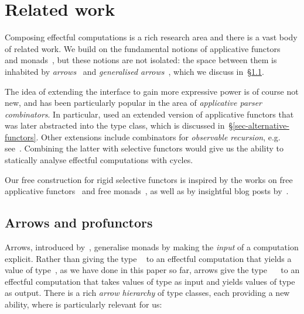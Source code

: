 \section{Related work}\label{sec-related}

Composing effectful computations is a rich research area and there is a vast
body of related work. We build on the fundamental notions of applicative
functors~\citep{mcbride2008applicative} and
monads~\citep{moggi1991notions,1995_wadler_monads}, but these notions are not
isolated: the space between them is inhabited by
\emph{arrows}~\citep{hughes2000arrows} and \emph{generalised
arrows}~\citep{megacz2011hardware}, which we discuss in~\S\ref{sec-arrows}.

The idea of extending the  interface to gain more expressive
power is of course not new, and has been particularly popular in
the area of \emph{applicative parser combinators}. In particular,
\citet{swierstra1996parsers} used an extended version of applicative functors
that was later abstracted into the  type class, which is
discussed in~\S\ref{sec-alternative-functors}. Other extensions include
combinators for \emph{observable recursion}, e.g.
see~\citep{devriese2012finally,devriese2013fixing}. Combining the latter with
selective functors would give us the ability to statically analyse effectful
computations with cycles.

Our free construction for rigid selective functors is inspired by the works
on free applicative functors~\citep{free-applicatives} and free
monads~\citep{swierstra2008data}, as well as by insightful blog posts
by~\citet{fancher2016free,fancher2017static}.

\subsection{Arrows and profunctors}\label{sec-arrows}

Arrows, introduced by~\citet{hughes2000arrows}, generalise monads by making the
\emph{input} of a computation explicit. Rather than giving the type
~ to an effectful computation that yields a value of type~, as
we have done in this paper so far, arrows give the type ~~ to
an effectful computation that takes values of type  as input and yields
values of type  as output. There is a rich \emph{arrow hierarchy} of type
classes, each providing a new ability, where  is particularly
relevant for us:

